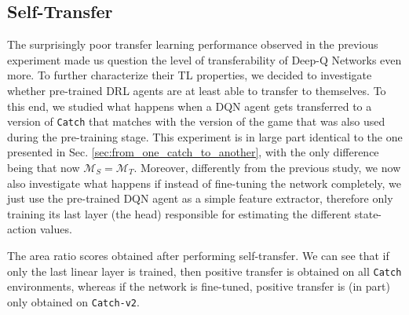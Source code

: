 



\subsection{Self-Transfer}
\label{sec:self_transfer}

The surprisingly poor transfer learning performance observed in the previous experiment made us question the level of transferability of Deep-Q Networks even more. To further characterize their TL properties, we decided to investigate whether pre-trained DRL agents are at least able to transfer to themselves. To this end, we studied what happens when a DQN agent gets transferred to a version of \texttt{Catch} that matches with the version of the game that was also used during the pre-training stage. This experiment is in large part identical to the one presented in Sec. \ref{sec:from_one_catch_to_another}, with the only difference being that now $\mathcal{M}_S = \mathcal{M}_T$. Moreover, differently from the previous study, we now also investigate what happens if instead of fine-tuning the network completely, we just use the pre-trained DQN agent as a simple feature extractor, therefore only training its last layer (the head) responsible for estimating the different state-action values.  
\begin{table}[ht!]
	\centering
	\caption{The area ratio scores obtained after performing self-transfer. We can see that if only the last linear layer is trained, then positive transfer is obtained on all \texttt{Catch} environments, whereas if the network is fine-tuned, positive transfer is (in part) only obtained on \texttt{Catch-v2}.}
	
	\label{tab:self_tl_area_ratio}
\end{table}
